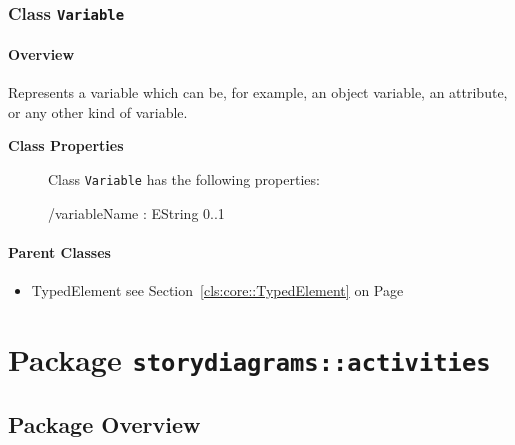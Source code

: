 \subsubsection{\Large{Class \bfseries \texttt{Variable}\normalfont}}
\label{cls:storydiagrams::Variable} 
\paragraph{Overview}

	
			
Represents a variable which can be, for example, an object variable, an attribute, or any other kind of variable.	
		
	


\begin{description}

	\item[\textbf{Class Properties}] Class \texttt{Variable} has the following properties:
	\begin{description}
\item[/variableName : EString 			0..1]

\hspace{\fill}
\nopagebreak


	
	\end{description}
	
	

\end{description}

\paragraph{Parent Classes}
\begin{itemize}
\item TypedElement see Section~\ref{cls:core::TypedElement} on Page~\pageref{cls:core::TypedElement}\end{itemize}
\newpage
		


\section{Package \bfseries \texttt{storydiagrams::activities}\normalfont}
\subsection{Package Overview}
			
